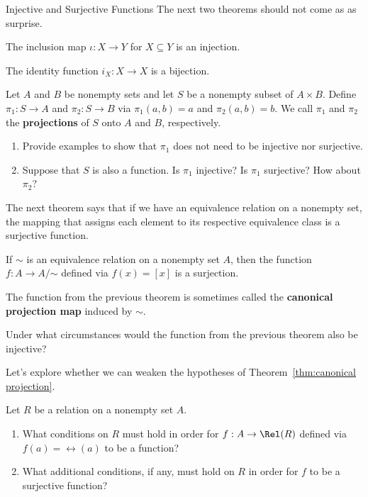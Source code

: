 \begin{section}{Injective and Surjective Functions}
The next two theorems should not come as as surprise.

\begin{theorem}
The inclusion map $\iota:X\to Y$ for $X\subseteq Y$ is an injection.
\end{theorem}

\begin{theorem}
The identity function $i_X:X\to X$ is a bijection.
\end{theorem}

\begin{problem}
Let $A$ and $B$ be nonempty sets and let $S$ be a nonempty subset of $A\times B$.  Define $\pi_{1}:S\to A$ and $\pi_{2}:S\to B$ via $\pi_{1}(a,b)=a$ and $\pi_{2}(a,b)=b$.  We call $\pi_{1}$ and $\pi_{2}$ the \textbf{projections} of $S$ onto $A$ and $B$, respectively.
\begin{enumerate}[label=\textrm{(\alph*)}]
\item Provide examples to show that $\pi_{1}$ does not need to be injective nor surjective.
\item Suppose that $S$ is also a function. Is $\pi_{1}$ injective? Is $\pi_{1}$ surjective?  How about $\pi_{2}$?
\end{enumerate}
\end{problem}

The next theorem says that if we have an equivalence relation on a nonempty set, the mapping that assigns each element to its respective equivalence class is a surjective function.  

\begin{theorem}\label{thm:canonical projection}
If $\sim$ is an equivalence relation on a nonempty set $A$, then the function $f:A\to A/\mathord\sim$ defined via $f(x)=[x]$ is a surjection.
\end{theorem}

The function from the previous theorem is sometimes called the \textbf{canonical projection map} induced by $\sim$.

\begin{problem}
Under what circumstances would the function from the previous theorem also be injective?
\end{problem}

Let's explore whether we can weaken the hypotheses of Theorem~\ref{thm:canonical projection}. 

\begin{problem}
Let $R$ be a relation on a nonempty set $A$.
\begin{enumerate}[label=\textrm{(\alph*)}]
\item What conditions on $R$ must hold in order for $f:A\to \Rel(R)$ defined via $f(a)=\rel(a)$ to be a function?
\item What additional conditions, if any, must hold on $R$ in order for $f$ to be a surjective function?
\end{enumerate}
\end{problem}


\end{section}
